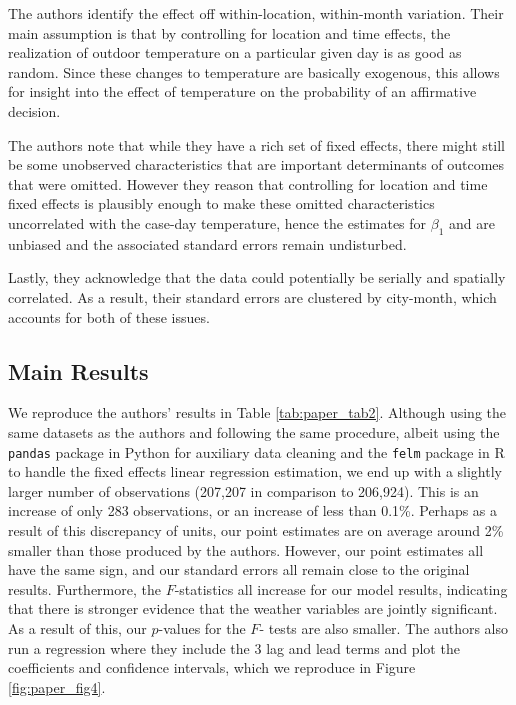 \documentclass{article}
\begin{document}
	The authors identify the effect off within-location, within-month variation. Their main assumption is that by controlling for location and time effects, the realization of outdoor temperature on a particular given day is as good as random. Since these changes to temperature are basically exogenous, this allows for insight into the effect of temperature on the probability of an affirmative decision.
	
	The authors note that while they have a rich set of fixed effects, there might still be some unobserved characteristics that are important determinants of outcomes that were omitted. However they reason that controlling for location and time fixed effects is plausibly enough to make these omitted characteristics uncorrelated with the case-day temperature, hence the estimates for $\beta_1$ and are unbiased and the associated standard errors remain undisturbed.  
	
	Lastly, they acknowledge that the data could potentially be serially and spatially correlated. As a result, their standard errors are clustered by city-month, which accounts for both of these issues. 
	
	\subsection{Main Results}
	
	We reproduce the authors' results in Table \ref{tab:paper_tab2}. Although using the same datasets as the authors and following the same procedure, albeit using the \verb*|pandas| package in Python for auxiliary data cleaning and the \verb*|felm| package in R to handle the fixed effects linear regression estimation, we end up with a slightly larger number of observations (207,207 in comparison to 206,924). This is an increase of only 283 observations, or an increase of less than 0.1\%. Perhaps as a result of this discrepancy of units, our point estimates are on average around 2\% smaller than those produced by the authors. However, our point estimates all have the same sign, and our standard errors all remain close to the original results. Furthermore, the $F$-statistics all increase for our model results, indicating that there is stronger evidence that the weather variables are jointly significant. As a result of this, our $p$-values for the $F$- tests are also smaller. The authors also run a regression where they include the 3 lag and lead terms and plot the coefficients and confidence intervals, which we reproduce in Figure \ref{fig:paper_fig4}. 
	
\end{document}
